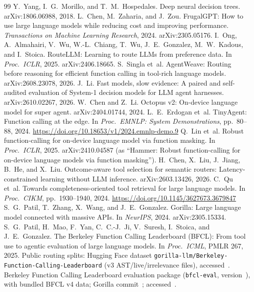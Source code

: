 \documentclass[10pt,twocolumn,letterpaper]{article}
\begin{document}
\begin{thebibliography}{99}
 Y.~Yang, I.~G.~Morillo, and T.~M.~Hospedales. Deep neural decision trees. arXiv:1806.06988, 2018.
 L.~Chen, M.~Zaharia, and J.~Zou. FrugalGPT: How to use large language models while reducing cost and improving performance. \emph{Transactions on Machine Learning Research}, 2024. arXiv:2305.05176.
 I.~Ong, A.~Almahairi, V.~Wu, W.-L.~Chiang, T.~Wu, J.~E.~Gonzalez, M.~W.~Kadous, and I.~Stoica. RouteLLM: Learning to route LLMs from preference data. In \emph{Proc.\ ICLR}, 2025. arXiv:2406.18665.
 S.~Singla et~al. AgentWeave: Routing before reasoning for efficient function calling in tool-rich language models. arXiv:2608.23078, 2026.
 J.~Li. Fast models, slow evidence: A paired and self-audited evaluation of System-1 decision models for LLM agent harnesses. arXiv:2610.02267, 2026.
 W.~Chen and Z.~Li. Octopus v2: On-device language model for super agent. arXiv:2404.01744, 2024.
 L.~E.~Erdogan et~al. TinyAgent: Function calling at the edge. In \emph{Proc.\ EMNLP: System Demonstrations}, pp.~80--88, 2024. \url{https://doi.org/10.18653/v1/2024.emnlp-demo.9}
 Q.~Lin et~al. Robust function-calling for on-device language model via function masking. In \emph{Proc.\ ICLR}, 2025. arXiv:2410.04587 (as ``Hammer: Robust function-calling for on-device language models via function masking'').
 H.~Chen, X.~Liu, J.~Jiang, B.~He, and X.~Liu. Outcome-aware tool selection for semantic routers: Latency-constrained learning without LLM inference. arXiv:2603.13426, 2026.
 C.~Qu et~al. Towards completeness-oriented tool retrieval for large language models. In \emph{Proc.\ CIKM}, pp.~1930--1940, 2024. \url{https://doi.org/10.1145/3627673.3679847}
 S.~G.~Patil, T.~Zhang, X.~Wang, and J.~E.~Gonzalez. Gorilla: Large language model connected with massive APIs. In \emph{NeurIPS}, 2024. arXiv:2305.15334.
 S.~G.~Patil, H.~Mao, F.~Yan, C.~C.-J.~Ji, V.~Suresh, I.~Stoica, and J.~E.~Gonzalez. The Berkeley Function Calling Leaderboard (BFCL): From tool use to agentic evaluation of large language models. In \emph{Proc.\ ICML}, PMLR 267, 2025. Public routing splits: Hugging Face dataset \texttt{gorilla-llm/Berkeley-Function-Calling-Leaderboard} (v3 AST/live/irrelevance files), accessed~\numHermesDatasetAccess{}.
 Berkeley Function Calling Leaderboard evaluation package (\texttt{bfcl-eval}, version~\numBfclEvalVersion), with bundled BFCL v4 data; Gorilla commit~\numBfclGorillaCommit{}; accessed~\numBfclEvalAccess{}.

\end{thebibliography}
\end{document}
